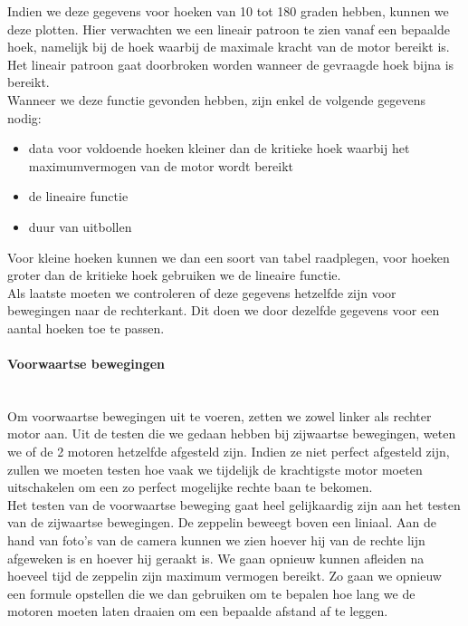\documentclass[eind]{penoverslag}
\begin{document}
Indien we deze gegevens voor hoeken van 10 tot 180 graden hebben, kunnen we deze plotten. Hier verwachten we een lineair patroon te zien vanaf een bepaalde hoek, namelijk bij de hoek waarbij de maximale kracht van de motor bereikt is. Het lineair patroon gaat doorbroken worden wanneer de gevraagde hoek bijna is bereikt. \\

Wanneer we deze functie gevonden hebben, zijn enkel de volgende gegevens nodig:
\begin{itemize}
	\item data voor voldoende hoeken kleiner dan de kritieke hoek waarbij het maximumvermogen van de motor wordt bereikt
	\item de lineaire functie
	\item duur van uitbollen
\end{itemize}
Voor kleine hoeken kunnen we dan een soort van tabel raadplegen, voor hoeken groter dan de kritieke hoek gebruiken we de lineaire functie. \\

Als laatste moeten we controleren of deze gegevens hetzelfde zijn voor bewegingen naar de rechterkant.  Dit doen we door dezelfde gegevens voor een aantal hoeken toe te passen. \\

\paragraph{Voorwaartse bewegingen} ~\\ 
Om voorwaartse bewegingen uit te voeren, zetten we zowel linker als rechter motor aan. Uit de testen die we gedaan hebben bij zijwaartse bewegingen, weten we of de 2 motoren hetzelfde afgesteld zijn. Indien ze niet perfect afgesteld zijn, zullen we moeten testen hoe vaak we tijdelijk de krachtigste motor moeten uitschakelen om een zo perfect mogelijke rechte baan te bekomen. \\

Het testen van de voorwaartse beweging gaat heel gelijkaardig zijn aan het testen van de zijwaartse bewegingen.  De zeppelin beweegt boven een liniaal.  Aan de hand van foto's van de camera kunnen we zien hoever hij van de rechte lijn afgeweken is en hoever hij geraakt is. We gaan opnieuw kunnen afleiden na hoeveel tijd de zeppelin zijn maximum vermogen bereikt. Zo gaan we opnieuw een formule opstellen die we dan gebruiken om te bepalen hoe lang we de motoren moeten laten draaien om een bepaalde afstand af te leggen. \\
\end{document}
